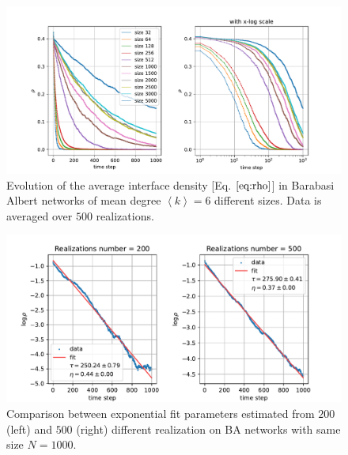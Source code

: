 \begin{figure}[H]
    \centering
    \includegraphics[width=\linewidth]{latex_source/images/voter/BA_node_update_rule_results_logscale.pdf}
    \caption{Evolution of the average interface density [Eq. $\ref{eq:rho}$] in Barabasi Albert networks of mean degree $\left\langle k\right\rangle= 6$ different sizes. Data is averaged over $500$ realizations. }
    \label{fig:BA_evolution}
\end{figure}

\begin{figure}[H]
    \centering
    \includegraphics[width=\linewidth]{latex_source/images/voter/comparison.pdf}
    \caption{Comparison between exponential fit parameters estimated from $200$ (left) and $500$ (right) different realization on BA networks with same size $N=1000$. }
    \label{fig:enter-label}
\end{figure}

